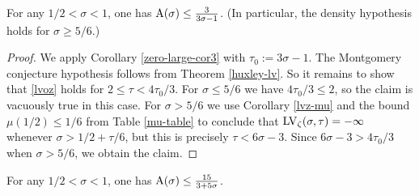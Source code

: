 \begin{theorem}\label{huxley-bound}\cite{Huxley} For any $1/2 < \sigma < 1$, one has $\mathrm{A}(\sigma) \leq \frac{3}{3\sigma-1}$. (In particular, the density hypothesis holds for $\sigma \geq 5/6$.)
\end{theorem}
\literature
{}
\derived
{}

\begin{proof} We apply Corollary \ref{zero-large-cor3} with $\tau_0 := 3\sigma-1$.  The Montgomery conjecture hypothesis follows from Theorem \ref{huxley-lv}. So it remains to show that \eqref{lvoz} holds for $2 \leq \tau < 4\tau_0/3$.  For $\sigma \leq 5/6$ we have $4\tau_0/3 \leq 2$, so the claim is vacuously true in this case.  For $\sigma > 5/6$ we use Corollary \ref{lvz-mu} and the bound $\mu(1/2) \leq 1/6$ from Table \ref{mu-table} to conclude that
$\mathrm{LV}_\zeta(\sigma,\tau) = -\infty$ whenever $\sigma > 1/2 + \tau/6$, but this is precisely $\tau < 6\sigma - 3$.  Since $6\sigma-3 > 4\tau_0/3$ when $\sigma > 5/6$, we obtain the claim.
\end{proof}

\begin{theorem}\label{guth-maynard-density}  For any $1/2 < \sigma < 1$, one has $\mathrm{A}(\sigma) \leq \frac{15}{3+5\sigma}$.
\end{theorem}
\literature
{}
\derived
{}

